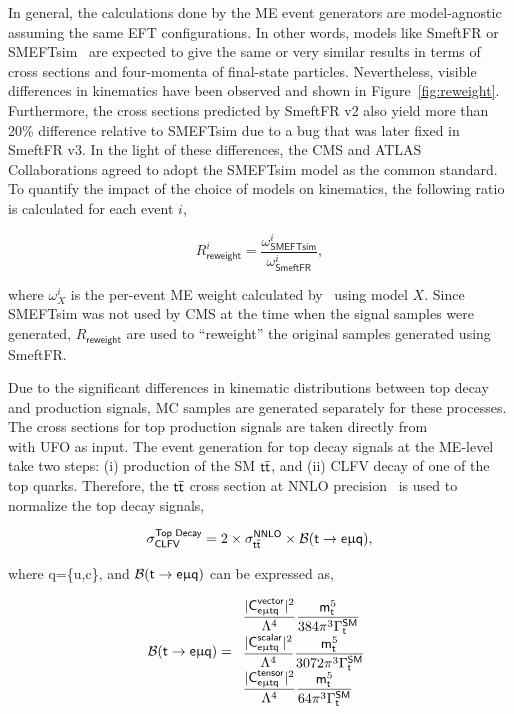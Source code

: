 In general, the calculations done by the \ac{ME} event generators are model-agnostic assuming the same \ac{EFT} configurations. In other words, models like SmeftFR or SMEFTsim~\cite{Brivio:2017btx} are expected to give the same or very similar results in terms of cross sections and four-momenta of final-state particles. Nevertheless, visible differences in kinematics have been observed and shown in Figure~\ref{fig:reweight}. Furthermore, the cross sections predicted by SmeftFR v2 also yield more than 20\% difference relative to SMEFTsim due to a bug that was later fixed in SmeftFR v3. In the light of these differences, the \ac{CMS} and \ac{ATLAS} Collaborations agreed to adopt the SMEFTsim model as the common standard.  To quantify the impact of the choice of models on kinematics, the following ratio is calculated for each event $i$,

\begin{equation}
\label{eq:2}
R_{\textsf{reweight}}^{i}=\frac{\omega_{\textsf{SMEFTsim}}^i}{\omega_{\textsf{SmeftFR}}^i},
\end{equation}

where $\omega^{i}_{X}$ is the per-event \ac{ME} weight calculated by \MG~using model $X$. Since SMEFTsim was not used by \ac{CMS} at the time when the signal samples were generated, $R_{\textsf{reweight}}$ are used to ``reweight'' the original samples generated using SmeftFR.

Due to the significant differences in kinematic distributions between top decay and production signals, \ac{MC} samples are generated separately for these processes. The cross sections for top production signals are taken directly from \MG \\with {} UFO as input. The event generation for top decay signals at the \ac{ME}-level take two steps: (i) production of the SM $\textsf{t}\overline{\textsf{t}}$, and (ii) \ac{CLFV} decay of one of the top quarks. Therefore, the $\textsf{t}\overline{\textsf{t}}$ cross section at \ac{NNLO} precision~\cite{Czakon:2011xx} is used to normalize the top decay signals,

\begin{equation}
\label{eq:3}
\sigma_{\textsf{CLFV}}^{\textsf{Top Decay}}=2\times\sigma_{\textsf{t}\overline{\textsf{t}}}^{\textsf{NNLO}}\times\mathcal{B}(\textsf{t}\rightarrow\textsf{e}\upmu\textsf{q}),
\end{equation}

where q=\{u,c\}, and $\mathcal{B}(\textsf{t}\rightarrow\textsf{e}\upmu\textsf{q})$ \cite{Kile:2008rp} can be expressed as,

\begin{equation}
\label{eq:4}
\mathcal{B}(\textsf{t}\rightarrow\textsf{e}\upmu\textsf{q}) = 
  \begin{array}{l}
  \displaystyle
  \frac{|\textsf{C}^{\textsf{vector}}_{\textsf{e}\upmu\textsf{t{q}}}|^2}{\mathrm{\Lambda}^4}\frac{\textsf{m}_\textsf{t}^5}{384\pi^3\mathrm{\Gamma}_{\textsf{t}}^{\textsf{SM}}} \\
  \displaystyle
  \frac{|\textsf{C}^{\textsf{scalar}}_{\textsf{e}\upmu\textsf{t{q}}}|^2}{\mathrm{\Lambda}^4}\frac{\textsf{m}_\textsf{t}^5}{3072\pi^3\mathrm{\Gamma}_{\textsf{t}}^{\textsf{SM}}} \\
  \displaystyle
  \frac{|\textsf{C}^{\textsf{tensor}}_{\textsf{e}\upmu\textsf{t{q}}}|^2}{\mathrm{\Lambda}^4}\frac{\textsf{m}_\textsf{t}^5}{64\pi^3\mathrm{\Gamma}_{\textsf{t}}^{\textsf{SM}}} 
\end{array}
\end{equation}

